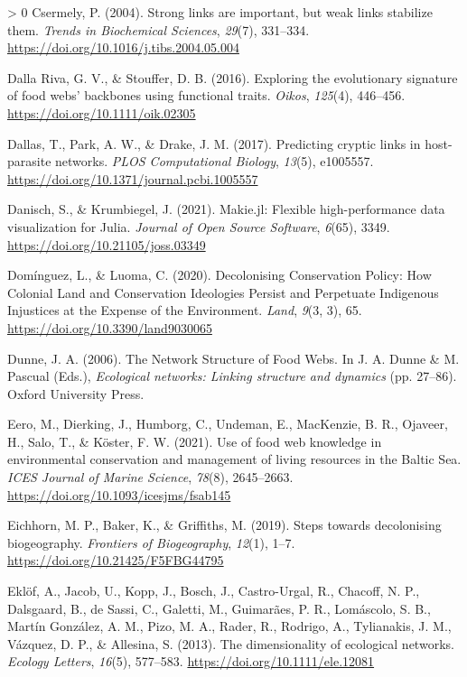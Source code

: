 \documentclass[10pt,oneside]{article}
\newlength{\cslhangindent}
\newenvironment{CSLReferences}[3] %
 {%
  \setlength{\parindent}{0pt}
  \ifodd #1 \everypar{\setlength{\hangindent}{\cslhangindent}}\ignorespaces\fi
  \ifnum #2 > 0
  \setlength{\parskip}{#2\baselineskip}
  \fi
 }%
 {}
\begin{document}
\begin{CSLReferences}{1}{0}
\leavevmode\hypertarget{ref-Csermely2004StrLin}{}%
Csermely, P. (2004). Strong links are important, but weak links
stabilize them. \emph{Trends in Biochemical Sciences}, \emph{29}(7),
331--334. \url{https://doi.org/10.1016/j.tibs.2004.05.004}

\leavevmode\hypertarget{ref-DallaRiva2016ExpEvo}{}%
Dalla Riva, G. V., \& Stouffer, D. B. (2016). Exploring the evolutionary
signature of food webs' backbones using functional traits. \emph{Oikos},
\emph{125}(4), 446--456. \url{https://doi.org/10.1111/oik.02305}

\leavevmode\hypertarget{ref-Dallas2017PreCry}{}%
Dallas, T., Park, A. W., \& Drake, J. M. (2017). Predicting cryptic
links in host-parasite networks. \emph{PLOS Computational Biology},
\emph{13}(5), e1005557.
\url{https://doi.org/10.1371/journal.pcbi.1005557}

\leavevmode\hypertarget{ref-Danisch2021MakJl}{}%
Danisch, S., \& Krumbiegel, J. (2021). Makie.jl: Flexible
high-performance data visualization for Julia. \emph{Journal of Open
Source Software}, \emph{6}(65), 3349.
\url{https://doi.org/10.21105/joss.03349}

\leavevmode\hypertarget{ref-Dominguez2020DecCon}{}%
Domínguez, L., \& Luoma, C. (2020). Decolonising Conservation Policy:
How Colonial Land and Conservation Ideologies Persist and Perpetuate
Indigenous Injustices at the Expense of the Environment. \emph{Land},
\emph{9}(3, 3), 65. \url{https://doi.org/10.3390/land9030065}

\leavevmode\hypertarget{ref-Dunne2006NetStr}{}%
Dunne, J. A. (2006). The Network Structure of Food Webs. In J. A. Dunne
\& M. Pascual (Eds.), \emph{Ecological networks: Linking structure and
dynamics} (pp. 27--86). Oxford University Press.

\leavevmode\hypertarget{ref-Eero2021UseFoo}{}%
Eero, M., Dierking, J., Humborg, C., Undeman, E., MacKenzie, B. R.,
Ojaveer, H., Salo, T., \& Köster, F. W. (2021). Use of food web
knowledge in environmental conservation and management of living
resources in the Baltic Sea. \emph{ICES Journal of Marine Science},
\emph{78}(8), 2645--2663. \url{https://doi.org/10.1093/icesjms/fsab145}

\leavevmode\hypertarget{ref-Eichhorn2019SteDec}{}%
Eichhorn, M. P., Baker, K., \& Griffiths, M. (2019). Steps towards
decolonising biogeography. \emph{Frontiers of Biogeography},
\emph{12}(1), 1--7. \url{https://doi.org/10.21425/F5FBG44795}

\leavevmode\hypertarget{ref-Eklof2013DimEco}{}%
Eklöf, A., Jacob, U., Kopp, J., Bosch, J., Castro-Urgal, R., Chacoff, N.
P., Dalsgaard, B., de Sassi, C., Galetti, M., Guimarães, P. R.,
Lomáscolo, S. B., Martín González, A. M., Pizo, M. A., Rader, R.,
Rodrigo, A., Tylianakis, J. M., Vázquez, D. P., \& Allesina, S. (2013).
The dimensionality of ecological networks. \emph{Ecology Letters},
\emph{16}(5), 577--583. \url{https://doi.org/10.1111/ele.12081}


\end{CSLReferences}
\end{document}
